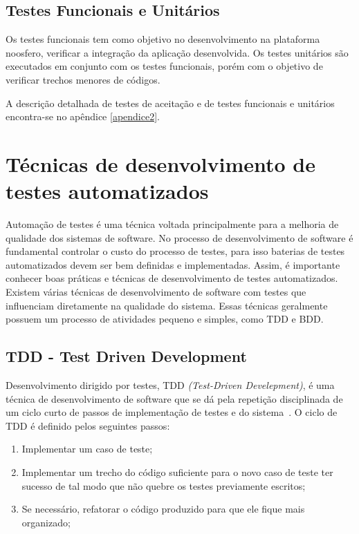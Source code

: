 \subsection{Testes Funcionais e Unitários}
%
Os testes funcionais tem como objetivo no desenvolvimento na plataforma noosfero, verificar a integração da aplicação desenvolvida. Os testes unitários são executados em conjunto com os testes funcionais, porém  com o objetivo de verificar trechos menores de códigos. 

A descrição detalhada de testes de aceitação e de testes funcionais e unitários encontra-se no apêndice \ref{apendice2}.

\section{Técnicas de desenvolvimento de testes automatizados}

Automação de testes é uma técnica voltada principalmente para a melhoria de 
qualidade dos sistemas de software. 
%
No processo de desenvolvimento de software é fundamental controlar o custo do 
processo de testes, para isso baterias de testes automatizados devem ser bem 
definidas e implementadas. Assim, é importante conhecer boas práticas e técnicas 
de desenvolvimento de testes automatizados.    
%
Existem várias técnicas de desenvolvimento de software com testes que influenciam 
diretamente na qualidade do sistema. Essas técnicas geralmente possuem um processo 
de atividades pequeno e simples, como TDD e BDD.

\subsection{TDD - Test Driven Development}

Desenvolvimento dirigido por testes, TDD \textit{(Test-Driven Develepment)}, 
é uma técnica de desenvolvimento de software que se dá pela repetição disciplinada 
de um ciclo curto de passos de implementação de testes e do sistema~\cite{koskela2007}.
%
O ciclo de TDD é definido pelos seguintes passos:
%
\begin{enumerate}
\item Implementar um caso de teste;
\item Implementar um trecho do código suficiente para o novo caso de teste ter sucesso 
de tal modo que não quebre os testes previamente escritos;
\item Se necessário, refatorar o código produzido para que ele fique mais organizado;
\end{enumerate}

